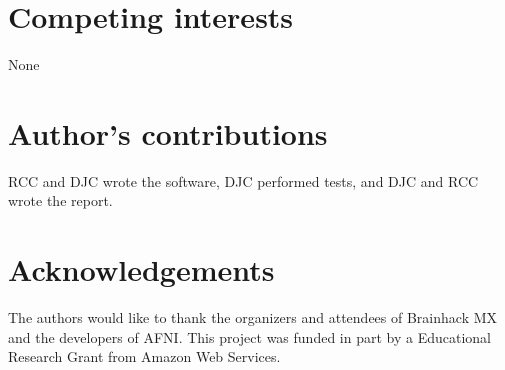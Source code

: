 \documentclass[11pt]{bmc_article_s50}
\begin{document}
\section*{Competing interests}
None

\section*{Author's contributions}
RCC and DJC wrote the software, DJC performed tests, and DJC and RCC
wrote the report.

\section*{Acknowledgements}
The authors would like to thank the organizers and attendees of
Brainhack MX and the developers of AFNI. This project was funded in part
by a Educational Research Grant from Amazon Web Services.

  
  

\end{document}
